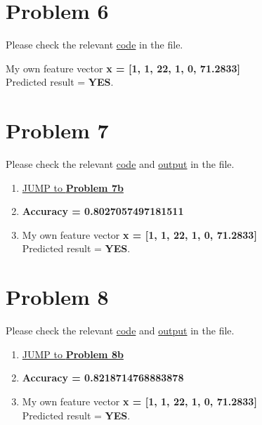 \documentclass{article}
\begin{document}
\section*{Problem 6}
    \begin{center}
        Please check the relevant \href{https://github.com/z-zijie/2020Fall/blob/master/COMP760/Homework4/code.py}{code} in the file.
    \end{center}
    My own feature vector \textbf{x = [1, 1, 22, 1, 0, 71.2833]}\\
    Predicted result = \textbf{YES}.

    \section*{Problem 7}
    \begin{center}
        Please check the relevant \href{https://github.com/z-zijie/2020Fall/blob/master/COMP760/Homework4/code.py}{code} and \href{https://github.com/z-zijie/2020Fall/blob/master/COMP760/Homework4/P7.txt}{output} in the file.
    \end{center}
    \begin{enumerate}
        \item \hyperref[sec:P7b]{JUMP to \textbf{Problem 7b}}
        
        \item \textbf{Accuracy = 0.8027057497181511}
            \label{sec:P7b}
        \item My own feature vector \textbf{x = [1, 1, 22, 1, 0, 71.2833]}\\
        Predicted result = \textbf{YES}.
    \end{enumerate}

\section*{Problem 8}
    \begin{center}
        Please check the relevant \href{https://github.com/z-zijie/2020Fall/blob/master/COMP760/Homework4/code.py}{code} and \href{https://github.com/z-zijie/2020Fall/blob/master/COMP760/Homework4/P8.txt}{output} in the file.
    \end{center}
    \begin{enumerate}
        \item \hyperref[sec:P8b]{JUMP to \textbf{Problem 8b}}
        
        \item \textbf{Accuracy = 0.8218714768883878}
            \label{sec:P8b}
        \item My own feature vector \textbf{x = [1, 1, 22, 1, 0, 71.2833]}\\
        Predicted result = \textbf{YES}.
    \end{enumerate}
\pagebreak
\end{document}
